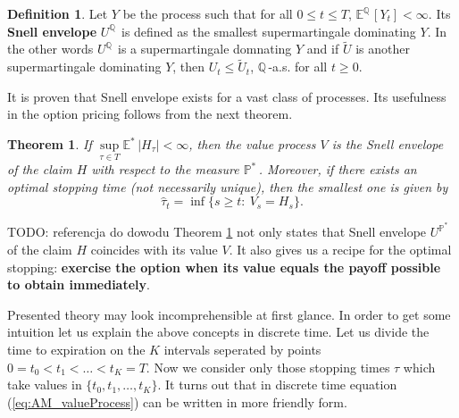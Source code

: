 \documentclass[a4paper,12pt, oneside]{book}
\newtheorem{thm}{Theorem}[chapter]
\theoremstyle{definition}
\newtheorem{mydef}{Definition}[chapter]
\theoremstyle{remark}
\def\E{{\mathbb{E}}}
\def\Q{{\mathbb{Q}}\,}
\def\Em{{\mathbb{E}^*}\,}
\def\Pm{{\mathbb{P}}^*\,}
\begin{document}
\begin{mydef}
 Let $Y$ be the process such that for all $0 \leq t \leq T$, $\E^{\Q}[Y_t] < \infty$. Its \textbf{Snell envelope} $U^{\Q}$ is defined as the smallest supermartingale dominating $Y$. In the other words $U^{\Q}$ is a supermartingale domnating $Y$ and if $\tilde{U}$ is another supermartingale dominating $Y$, then $U_t \leq \tilde{U}_t$, $\Q$-a.s. for all $t \geq 0$.
\end{mydef}
It is proven that Snell envelope exists for a vast class of processes. Its usefulness in the option pricing follows from the next theorem.
\begin{thm}
 \label{thm:snell}
 If $\sup\limits_{\tau \in T} \Em|H_{\tau}| < \infty$, then the value process $V$ is the Snell envelope of the claim $H$ with respect to the measure $\Pm$. Moreover, if there exists an optimal stopping time (not necessarily unique), then the smallest one is given by
 \begin{equation}
  \label{eq:optStop}
  \hat{\tau}_t = \inf\{ s \geq t:\ V_s = H_s \}.
 \end{equation}
\end{thm}
{\LARGE \color{red} TODO: referencja do dowodu}
Theorem \ref{thm:snell} not only states that Snell envelope $U^{\Pm}$ of the claim $H$ coincides with its value $V$. It also gives us a recipe for the optimal stopping: \textbf{exercise the option when its value equals the payoff possible to obtain immediately}.

Presented theory may look incomprehensible at first glance. In order to get some intuition let us explain the above concepts in discrete time. Let us divide the time to expiration on the $K$ intervals seperated by points $0 = t_0 < t_1 < \ldots < t_K = T$. Now we consider only those stopping times $\tau$ which take values in $\{t_0, t_1, \ldots, t_K\}$. It turns out that in discrete time equation (\ref{eq:AM_valueProcess}) can be written in more friendly form.
\end{document}
